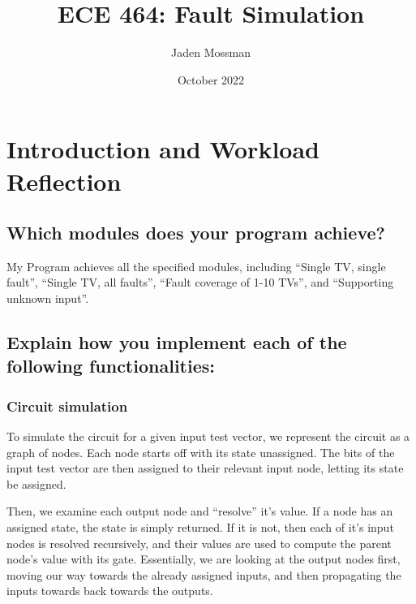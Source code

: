 \documentclass{article}
\title{ECE 464: Fault Simulation}
\author{Jaden Mossman}
\date{October 2022}
\begin{document}
    \maketitle
    \tableofcontents

    \newpage
    \section{Introduction and Workload Reflection}
            \subsection{Which modules does your program achieve?}
            
            My Program achieves all the specified modules, including ``Single TV, single fault'', ``Single TV, all faults'', ``Fault coverage of 1-10 TVs'', and ``Supporting unknown input''.
            
            \subsection{Explain how you implement each of the following functionalities:}
                \subsubsection{Circuit simulation}
                
                To simulate the circuit for a given input test vector, we represent the circuit as a graph of nodes. Each node starts off with its state unassigned. The bits of the input test vector are then assigned to their relevant input node, letting its state be assigned.
                
                Then, we examine each output node and ``resolve'' it's value. If a node has an assigned state, the state is simply returned. If it is not, then each of it's input nodes is resolved recursively, and their values are used to compute the parent node's value with its gate. Essentially, we are looking at the output nodes first, moving our way towards the already assigned inputs, and then propagating the inputs towards back towards the outputs.
\end{document}

